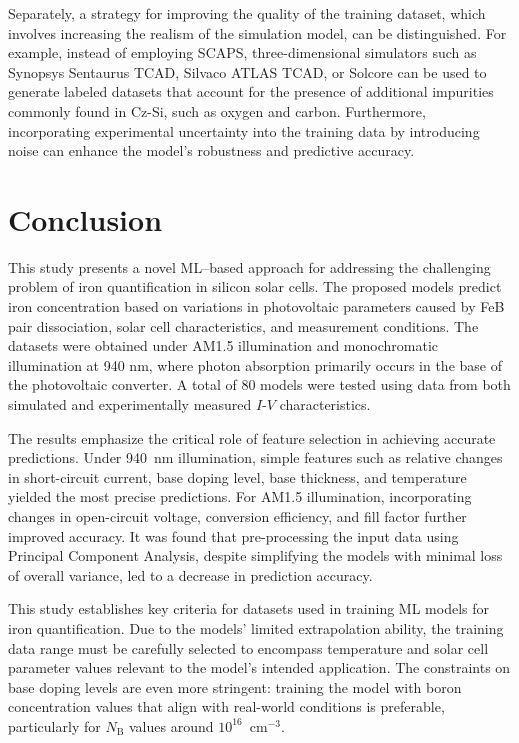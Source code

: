 \documentclass[a4paper,fleqn,draft]{cas-sc}
\begin{document}
Separately, a strategy for improving the quality of the training dataset,
which involves increasing the realism of the simulation model, can be distinguished.
For example, instead of employing SCAPS, three-dimensional simulators such as Synopsys Sentaurus TCAD,
Silvaco ATLAS TCAD, or Solcore can be used to generate labeled datasets
that account for the presence of additional impurities commonly found in Cz-Si,
such as oxygen and carbon.
Furthermore, incorporating experimental uncertainty into the training data by introducing noise
can enhance the model’s robustness and predictive accuracy.



\section{Conclusion}

This study presents a novel ML--based approach for addressing the challenging problem of
iron quantification in silicon solar cells.
The proposed models predict iron concentration based on variations in photovoltaic parameters caused by FeB pair dissociation,
solar cell characteristics, and measurement conditions.
The datasets were obtained under AM1.5 illumination and monochromatic illumination at 940 nm,
where photon absorption primarily occurs in the base of the photovoltaic converter.
A total of 80 models were tested using data from both simulated and experimentally measured $I$-$V$ characteristics.

The results emphasize the critical role of feature selection in achieving accurate predictions.
Under 940~nm illumination, simple features such as relative changes in short-circuit current,
base doping level, base thickness, and temperature yielded the most precise predictions.
For AM1.5 illumination, incorporating changes in open-circuit voltage, conversion efficiency, and fill factor further improved accuracy.
It was found that pre-processing the input data using Principal Component Analysis, despite simplifying the models with minimal loss of overall variance,
led to a decrease in prediction accuracy.


This study establishes key criteria for datasets used in training ML models for iron quantification.
Due to the models' limited extrapolation ability, the training data range must be carefully selected
to encompass temperature and solar cell parameter values relevant to the model’s intended application.
The constraints on base doping levels are even more stringent:
training the model with boron concentration values that align with real-world conditions is preferable, particularly for $N_\mathrm{B}$ values
around $10^{16}$~cm$^{-3}$.
\end{document}
